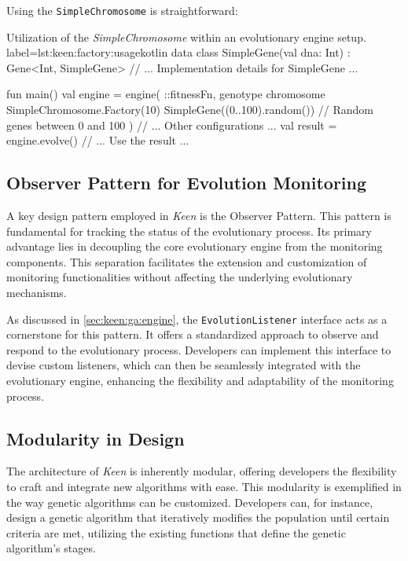     Using the \texttt{SimpleChromosome} is straightforward:

    \begin{code}{
      Utilization of the \textit{SimpleChromosome} within an evolutionary 
      engine setup.
    }{label=lst:keen:factory:usage}{kotlin}
      data class SimpleGene(val dna: Int) : Gene<Int, SimpleGene> {
          // ... Implementation details for SimpleGene ...
      }
            
      fun main() {
          val engine = engine(
              ::fitnessFn,
              genotype {
                  chromosome {
                      SimpleChromosome.Factory(10) { SimpleGene((0..100).random()) } // Random genes between 0 and 100
                  }
              }
          ) {
              // ... Other configurations ...
          }
          val result = engine.evolve()
          // ... Use the result ...
      }
    \end{code}

  \subsection{Observer Pattern for Evolution Monitoring}
    A key design pattern employed in \textit{Keen} is the Observer Pattern. This
    pattern is fundamental for tracking the status of the evolutionary process.
    Its primary advantage lies in decoupling the core evolutionary engine from
    the monitoring components. This separation facilitates the extension and
    customization of monitoring functionalities without affecting the underlying
    evolutionary mechanisms.

    As discussed in \vref{sec:keen:ga:engine}, the \texttt{EvolutionListener}
    interface acts as a cornerstone for this pattern. It offers a standardized
    approach to observe and respond to the evolutionary process. Developers can
    implement this interface to devise custom listeners, which can then be
    seamlessly integrated with the evolutionary engine, enhancing the
    flexibility and adaptability of the monitoring process.

  \subsection{Modularity in Design}
    The architecture of \textit{Keen} is inherently modular, offering developers
    the flexibility to craft and integrate new algorithms with ease. This
    modularity is exemplified in the way genetic algorithms can be customized.
    Developers can, for instance, design a genetic algorithm that iteratively
    modifies the population until certain criteria are met, utilizing the
    existing functions that define the genetic algorithm's stages.

